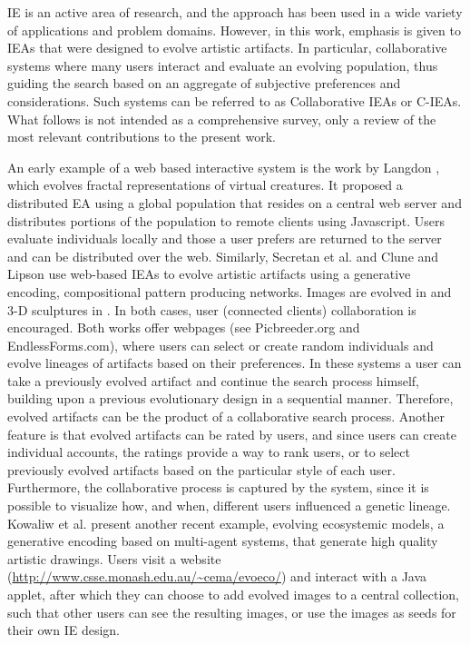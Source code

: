 \documentclass{llncs}
\begin{document}
IE is an active area of research, and the approach has been used in a wide variety of applications and problem domains.
However, in this work, emphasis is given to IEAs that were designed to evolve artistic artifacts.
In particular, collaborative systems where many users interact and evaluate an evolving population,
thus guiding the search based on an aggregate of subjective preferences and considerations.
Such systems can be referred to as Collaborative IEAs or C-IEAs.
What follows is not intended as a comprehensive survey, only a review of the most relevant contributions to the present work.


An early example of a web based interactive system is the work by Langdon \cite{langdon:2004}, which evolves fractal representations of virtual creatures.
It proposed a distributed EA using a global population that resides on a central web server and distributes
portions of the population to remote clients using Javascript.
Users evaluate individuals locally and those a user prefers are returned to the server and can be distributed over the web.
Similarly, Secretan et al. \cite{picbreeder} and Clune and Lipson \cite{forms} use web-based IEAs to evolve artistic artifacts
using a generative encoding, compositional pattern producing networks.
Images are evolved in \cite{picbreeder} and 3-D sculptures in \cite{forms} .
In both cases, user (connected clients) collaboration is encouraged.
Both works offer webpages (see Picbreeder.org and EndlessForms.com),
where users can select or create random individuals and evolve lineages of artifacts based on their preferences.
In these systems a user can take a previously evolved artifact and continue the search process himself, building upon a previous evolutionary design in a sequential
manner.
Therefore, evolved artifacts can be the product of a collaborative search process.
Another feature is that evolved artifacts can be rated by users, and since users can create individual accounts, the ratings provide a way to rank users,
or to select previously evolved artifacts based on the particular style of each user.
Furthermore, the collaborative process is captured by the system, since it is possible to visualize how, and when, different users influenced
a genetic lineage.
Kowaliw et al. \cite{evoeco} present another recent example, evolving ecosystemic models, a generative encoding based on multi-agent systems,
that generate high quality artistic drawings.
Users visit a website (\url{http://www.csse.monash.edu.au/~cema/evoeco/}) and interact with a Java applet,
after which they can choose to add evolved images to a central collection,
such that other users can see the resulting images, or use the images as seeds for their own IE design.
\end{document}
